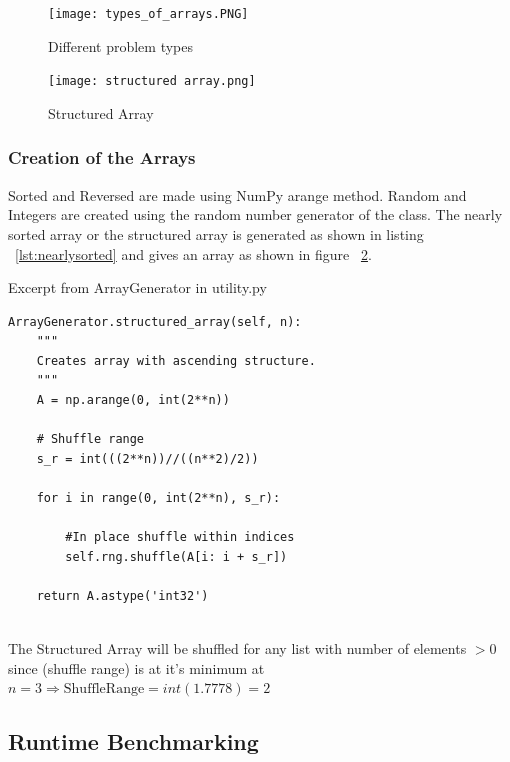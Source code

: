 \documentclass[sigconf, nonacm, natbib, screen, balance=False]{acmart}
\begin{document}
\begin{figure}
  \centering
  \texttt{[image: types\_of\_arrays.PNG]}
  \caption{Different problem types}
  \label{fig:arrays}
\end{figure}

\begin{figure}
  \centering
  \texttt{[image: structured array.png]}
  \caption{Structured Array}
  \label{fig:structarr}
\end{figure}

\subsubsection{Creation of the Arrays}\label{sec:createarrays}

Sorted and Reversed are made using NumPy arange method. Random and Integers are created using the random number generator of the class. The nearly sorted array or the structured array is generated as shown in listing ~\ref{lst:nearlysorted} and gives an array as shown in figure ~\ref{fig:structarr}.


\begin{listing}[h]
  \caption{Excerpt from ArrayGenerator in utility.py}
  \label{lst:nearlysorted}
  \begin{lstlisting}
ArrayGenerator.structured_array(self, n):
    """
    Creates array with ascending structure.
    """
    A = np.arange(0, int(2**n))
    
    # Shuffle range
    s_r = int(((2**n))//((n**2)/2))
    
    for i in range(0, int(2**n), s_r):

        #In place shuffle within indices
        self.rng.shuffle(A[i: i + s_r])

    return A.astype('int32')
   
  \end{lstlisting}
\end{listing}

The Structured Array will be shuffled for any list with number of elements $> 0$ since (shuffle range) is at it's minimum at $n = 3 \Rightarrow \text{ShuffleRange} = int(1.7778) = 2$

\subsection{Runtime Benchmarking}\label{sec:methbench}
\end{document}
